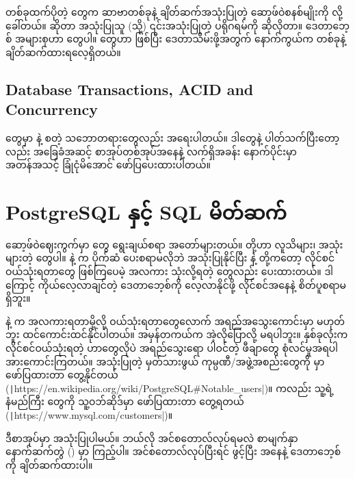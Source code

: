 တစ်ခုထက်ပိုတဲ့  တွေက ဆာဗာတစ်ခုနဲ့ ချိတ်ဆက်အသုံးပြုတဲ့ ဆော့ဖ်ဝဲစနစ်မျိုးကို   လို့ ခေါ်တယ်။  ဆိုတာ အသုံးပြုသူ  (သို့) ၎င်းအသုံးပြုတဲ့ ပရိုဂရမ်ကို ဆိုလိုတာ။ ဒေတာဘေ့စ်  အများစုဟာ  တွေပါ။  တွေဟာ  ဖြစ်ပြီး ဒေတာသိမ်းဖို့အတွက် နောက်ကွယ်က  တစ်ခုနဲ့ ချိတ်ဆက်ထားရလေ့ရှိတယ်။ 

\subsection*{Database Transactions, ACID and Concurrency}
 တွေမှာ   နဲ့  စတဲ့ သဘောတရားတွေလည်း အရေးပါတယ်။  ဒါတွေနဲ့ ပါတ်သက်ပြီးတော့လည်း အခြေခံအဆင့် စာအုပ်တစ်အုပ်အနေနဲ့ လက်ရှိအခန်း နောက်ပိုင်းမှာ အတန်အသင့် ခြုံငုံမိအောင် ဖော်ပြပေးထားပါတယ်။

\clearpage





\section{PostgreSQL နှင့် SQL မိတ်ဆက်}
ဆော့ဖ်ဝဲဈေးကွက်မှာ  တွေ ရွေးချယ်စရာ အတော်များတယ်။  တို့ဟာ လူသိများ၊ အသုံးများတဲ့  တွေပါ။  နဲ့  က ပိုက်ဆံ ပေးစရာမလိုဘဲ အသုံးပြုနိုင်ပြီး  နဲ့  တို့ကတော့ လိုင်စင်ဝယ်သုံးရတာတွေ ဖြစ်ကြပေမဲ့ အလကား သုံးလို့ရတဲ့  တွေလည်း ပေးထားတယ်။ ဒါကြောင့် ကိုယ်လေ့လာချင်တဲ့ ဒေတာဘေ့စ်ကို လေ့လာနိုင်ဖို့ လိုင်စင်အနေနဲ့ စိတ်ပူစရာမရှိဘူး။ 

 နဲ့  က အလကားရတာမို့လို့ ဝယ်သုံးရတာတွေလောက် အရည်အသွေးကောင်းမှာ မဟုတ်ဘူး ထင်ကောင်းထင်နိုင်ပါတယ်။ အမှန်တကယ်က အဲ့လိုပြောလို့ မရပါဘူး။ နှစ်ခုလုံးက လိုင်စင်ဝယ်သုံးရတဲ့ ဟာတွေလိုပဲ အရည်သွေးရော ပါဝင်တဲ့ ဖီချာတွေ စုံလင်မှုအရပါ အားကောင်းကြတယ်။  အသုံးပြုတဲ့ မှတ်သားဖွယ် ကုမ္ပဏီ/အဖွဲ့အစည်းတွေကို  မှာ ဖော်ပြထားတာ တွေ့နိုင်တယ် (\texttt|https://en.wikipedia.org/wiki/PostgreSQL#Notable_users|)။  ကလည်း သူ့ရဲ့ နံမည်ကြီး  တွေ‌ကို သူ့ဝဘ်ဆိုဒ်မှာ ဖော်ပြထားတာ တွေ့ရတယ်
(\texttt|https://www.mysql.com/customers|)။

% 

ဒီစာအုပ်မှာ  အသုံးပြုပါမယ်။  ဘယ်လို အင်စတောလ်လုပ်ရမလဲ စာမျက်နှာ \fRefNo{\pageref{apdx3}} နောက်ဆက်တွဲ (\fRefNo{\ref{apdx3}}) မှာ ကြည့်ပါ။ အင်စတောလ်လုပ်ပြီးရင်  ဖွင့်ပြီး  အနေနဲ့  ဒေတာဘေ့စ်ကို ချိတ်ဆက်ထားပါ။


